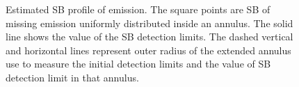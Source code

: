 \documentclass[twocolumn]{aastex61}
\begin{document}
\begin{figure}
\centering
{}
\caption{ Estimated SB profile of  emission. The square points are SB of missing  emission uniformly distributed inside an annulus. The solid line shows the value of the SB detection limits. The dashed vertical and horizontal lines represent outer radius of the extended annulus use to measure the initial detection limits and the value of SB detection limit in that annulus.}
\label{fig.emission}
\end{figure}


\newpage

\end{document}
